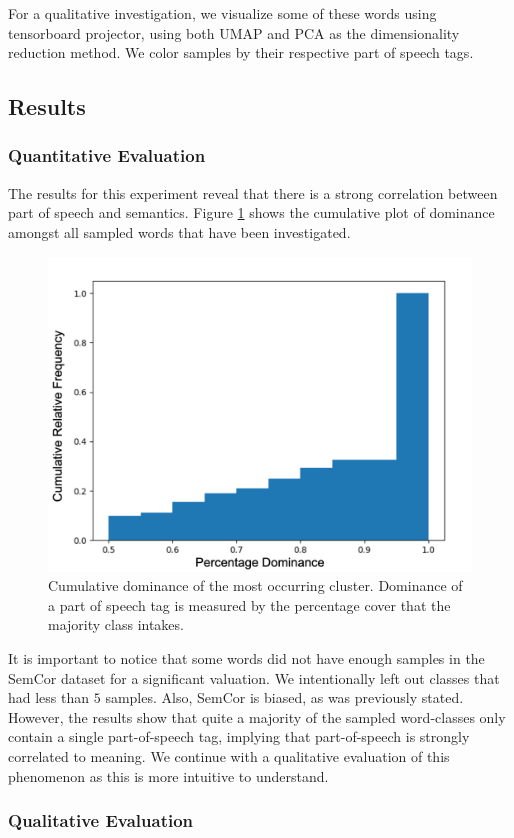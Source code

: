 \documentclass[a4paper,12pt,oneside,openright]{report}
\begin{document}
For a qualitative investigation, we visualize some of these words using tensorboard projector, using both UMAP and PCA as the dimensionality reduction method.
We color samples by their respective part of speech tags.

\subsection{Results}

\subsubsection{Quantitative Evaluation}

The results for this experiment reveal that there is a strong correlation between part of speech and semantics.
Figure \ref{fig:POS_dominance} shows the cumulative plot of dominance amongst all sampled words that have been investigated.

\begin{figure}[H]
	\center
  \includegraphics[width=0.5\linewidth]{./assets/experiments/pos_dominance_calculation.png}
  \caption{Cumulative dominance of the most occurring cluster. Dominance of a part of speech tag is measured by the percentage cover that the majority class intakes.}
  \label{fig:POS_dominance}
\end{figure}

It is important to notice that some words did not have enough samples in the SemCor dataset for a significant valuation. 
We intentionally left out classes that had less than $5$ samples.
Also, SemCor is biased, as was previously stated.
However, the results show that quite a majority of the sampled word-classes only contain a single part-of-speech tag, implying that part-of-speech is strongly correlated to meaning.
We continue with a qualitative evaluation of this phenomenon as this is more intuitive to understand.

\subsubsection{Qualitative Evaluation}
\end{document}
